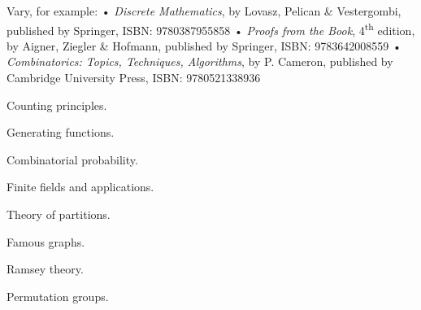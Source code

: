 \documentclass{osucourse}
\begin{document}
\CatalogDescription
\PrerequisitesAndExclusions

\begin{Text}
Vary, for example: • \emph{Discrete Mathematics}, by Lovasz, Pelican \& Vestergombi, published by Springer, ISBN: 9780387955858 • \emph{Proofs from the Book}, 4\textsuperscript{th} edition, by Aigner, Ziegler \& Hofmann, published by Springer, ISBN: 9783642008559 • \emph{Combinatorics: Topics, Techniques, Algorithms}, by P. Cameron, published by Cambridge University Press, ISBN: 9780521338936
\end{Text}

\begin{TopicsList}
\item Counting principles.
\item Generating functions.
\item Combinatorial probability.
\item Finite fields and applications.
\item Theory of partitions.
\item Famous graphs.
\item Ramsey theory.
\item Permutation groups.
\end{TopicsList}
\end{document}
